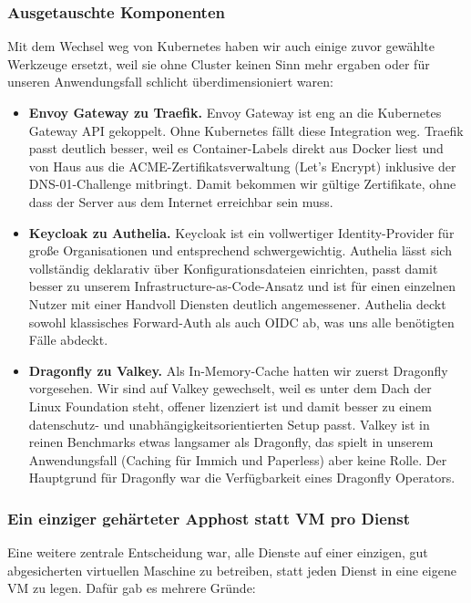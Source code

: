 \subsubsection*{Ausgetauschte Komponenten}

Mit dem Wechsel weg von Kubernetes haben wir auch einige zuvor gewählte
Werkzeuge ersetzt, weil sie ohne Cluster keinen Sinn mehr ergaben oder für
unseren Anwendungsfall schlicht überdimensioniert waren:

\begin{itemize}
  \item \textbf{Envoy Gateway zu Traefik.} Envoy Gateway ist eng an die
    Kubernetes Gateway \ac{API} gekoppelt. Ohne Kubernetes fällt diese
    Integration weg. Traefik passt deutlich besser, weil es Container-Labels
    direkt aus Docker liest und von Haus aus die \ac{ACME}-Zertifikatsverwaltung
    (Let's Encrypt) inklusive der \ac{DNS}-01-Challenge mitbringt. Damit bekommen
    wir gültige Zertifikate, ohne dass der Server aus dem Internet erreichbar
    sein muss.
  \item \textbf{Keycloak zu Authelia.} Keycloak ist ein vollwertiger
    Identity-Provider für große Organisationen und entsprechend schwergewichtig.
    Authelia lässt sich vollständig deklarativ über Konfigurationsdateien
    einrichten, passt damit besser zu unserem Infrastructure-as-Code-Ansatz und
    ist für einen einzelnen Nutzer mit einer Handvoll Diensten deutlich
    angemessener. Authelia deckt sowohl klassisches Forward-Auth als auch \ac{OIDC}
    ab, was uns alle benötigten Fälle abdeckt.\cite{keyCloak}
  \item \textbf{Dragonfly zu Valkey.} Als In-Memory-Cache hatten wir zuerst
    Dragonfly vorgesehen. Wir sind auf Valkey gewechselt, weil es unter dem
    Dach der Linux Foundation steht, offener lizenziert ist und damit besser zu
    einem datenschutz- und unabhängigkeitsorientierten Setup passt. Valkey ist
    in reinen Benchmarks etwas langsamer als Dragonfly, das spielt in unserem
    Anwendungsfall (Caching für Immich und Paperless) aber keine Rolle. Der Hauptgrund für Dragonfly war die Verfügbarkeit eines Dragonfly Operators.
\end{itemize}

\subsubsection*{Ein einziger gehärteter Apphost statt \ac{VM} pro Dienst}

Eine weitere zentrale Entscheidung war, alle Dienste auf einer einzigen, gut
abgesicherten virtuellen Maschine zu betreiben, statt jeden Dienst in eine
eigene \ac{VM} zu legen. Dafür gab es mehrere Gründe:

